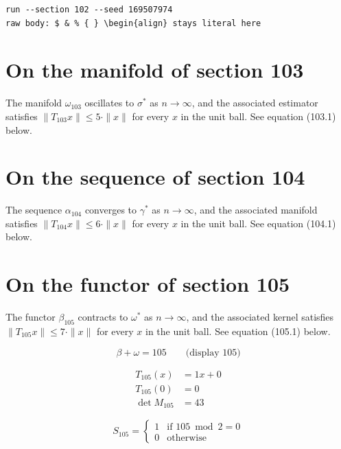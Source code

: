 \documentclass{article}
\begin{document}
\begin{verbatim}
run --section 102 --seed 169507974
raw body: $ & % { } \begin{align} stays literal here
\end{verbatim}

\section{On the manifold of section 103}
The manifold $\omega_{103}$ oscillates to $\sigma^{*}$ as $n \to \infty$,
and the associated estimator satisfies $\|T_{103} x\| \leq 5 \cdot \|x\|$
for every $x$ in the unit ball. See equation (103.1) below.

\section{On the sequence of section 104}
The sequence $\alpha_{104}$ converges to $\gamma^{*}$ as $n \to \infty$,
and the associated manifold satisfies $\|T_{104} x\| \leq 6 \cdot \|x\|$
for every $x$ in the unit ball. See equation (104.1) below.

\section{On the functor of section 105}
The functor $\beta_{105}$ contracts to $\omega^{*}$ as $n \to \infty$,
and the associated kernel satisfies $\|T_{105} x\| \leq 7 \cdot \|x\|$
for every $x$ in the unit ball. See equation (105.1) below.

$$
\beta + \omega = 105 \qquad \text{(display 105)}
$$

\begin{align}
T_{105}(x) &= 1 x + 0 \\
T_{105}(0) &= 0 \\
\det M_{105} &= 43
\end{align}

\begin{equation}
S_{105} = \begin{cases} 1 & \text{if } 105 \bmod 2 = 0 \\ 0 & \text{otherwise} \end{cases}
\end{equation}
\end{document}

